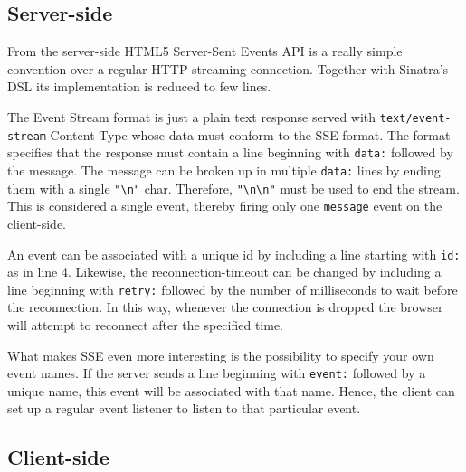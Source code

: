\subsection*{Server-side}

From the server-side HTML5 Server-Sent Events API is a really simple convention over a regular HTTP streaming connection. Together with Sinatra's DSL its implementation is reduced to few lines.


The Event Stream format is just a plain text response served with \texttt{text/event-stream} Content-Type whose data must conform to the SSE format. The format specifies that the response must contain a line beginning with \texttt{data:} followed by the message. The message can be broken up in multiple \texttt{data:} lines by ending them with a single \texttt{"\texttt{\textbackslash n}"} char. Therefore, \texttt{"\textbackslash n\textbackslash n"} must be used to end the stream. This is considered a single event, thereby firing only one \texttt{message} event on the client-side.

An event can be associated with a unique id by including a line starting with \texttt{id:} as in line 4. Likewise, the reconnection-timeout can be changed by including a line beginning with \texttt{retry:} followed by the number of milliseconds to wait before the reconnection. In this way, whenever the connection is dropped the browser will attempt to reconnect after the specified time.

What makes SSE even more interesting is the possibility to specify your own event names. If the server sends a line beginning with \texttt{event:} followed by a unique name, this event will be associated with that name. Hence, the client can set up a regular event listener to listen to that particular event.

\subsection*{Client-side}

